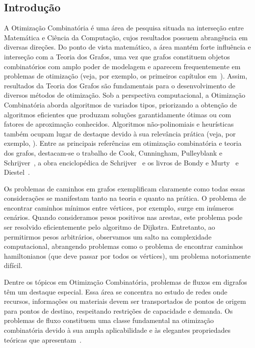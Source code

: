\documentclass{amsart}
\begin{document}
\subsection{Introdução}
A Otimização Combinatória é uma área de pesquisa situada na interseção entre Matemática e Ciência da Computação, cujos resultados possuem abrangência em diversas direções. Do ponto de vista matemático, a área mantém forte influência e interseção com a Teoria dos Grafos, uma vez que grafos constituem objetos combinatórios com amplo poder de modelagem e aparecem frequentemente em problemas de otimização (veja, por exemplo, os primeiros capítulos em~\cite{korte2018combinatorial}). Assim, resultados da Teoria dos Grafos são fundamentais para o desenvolvimento de diversos métodos de otimização. Sob a perspectiva computacional, a Otimização Combinatória aborda algoritmos de variados tipos, priorizando a obtenção de algoritmos eficientes que produzam soluções garantidamente ótimas ou com fatores de aproximação conhecidos. Algoritmos não-polinomiais e heurísticas também ocupam lugar de destaque devido à sua relevância prática (veja, por exemplo, \cite{reeves1993modern}). Entre as principais referências em otimização combinatória e teoria dos grafos, destacam-se o trabalho de Cook, Cunningham, Pulleyblank e Schrijver~\cite{cook1998combinatorial}, a obra enciclopédica de Schrijver~\cite{schrijver2003combinatorial} e os livros de Bondy e Murty~\cite{bondy2008graph} e Diestel~\cite{diestel2017graph}.

Os problemas de caminhos em grafos exemplificam claramente como todas essas considerações se manifestam tanto na teoria e quanto na prática. O problema de encontrar caminhos mínimos entre vértices, por exemplo, surge em inúmeros cenários. Quando consideramos pesos positivos nas arestas, este problema pode ser resolvido eficientemente pelo algoritmo de Dijkstra. Entretanto, ao permitirmos pesos arbitrários, observamos um salto na complexidade computacional, abrangendo problemas como o problema de encontrar caminhos hamiltonianos (que deve passar por todos os vértices), um problema notoriamente difícil.

Dentre os tópicos em Otimização Combinatória, problemas de fluxos em digrafos têm um destaque especial. Essa área se concentra no estudo de redes onde recursos, informações ou materiais devem ser transportados de pontos de origem para pontos de destino, respeitando restrições de capacidade e demanda. Os problemas de fluxo constituem uma classe fundamental na otimização combinatória devido à sua ampla aplicabilidade e às elegantes propriedades teóricas que apresentam~\cite{ahuja1993network}.
\end{document}

